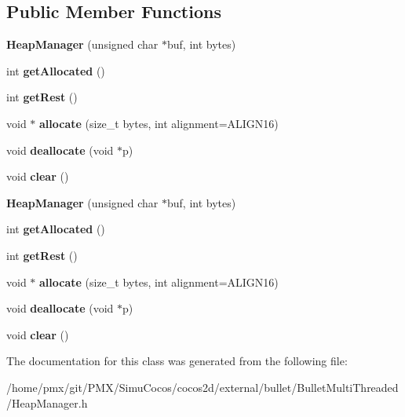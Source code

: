 \subsection*{Public Member Functions}
\begin{DoxyCompactItemize}
\item 
\mbox{\label{classHeapManager_a30a64630fa0e9d32080fcbdb9f243b75}} 
{\bfseries Heap\+Manager} (unsigned char $\ast$buf, int bytes)
\item 
\mbox{\label{classHeapManager_a6634102da3073f1b742a15171ace93d3}} 
int {\bfseries get\+Allocated} ()
\item 
\mbox{\label{classHeapManager_ab1c1762e6a5baedf2ad870b85a8b958e}} 
int {\bfseries get\+Rest} ()
\item 
\mbox{\label{classHeapManager_a20109bbc392db6d15b355a5ceb88166f}} 
void $\ast$ {\bfseries allocate} (size\+\_\+t bytes, int alignment=A\+L\+I\+G\+N16)
\item 
\mbox{\label{classHeapManager_a1ba5a00c9596ef5eedbaf984cb73cb6a}} 
void {\bfseries deallocate} (void $\ast$p)
\item 
\mbox{\label{classHeapManager_add0c480cf7618976a40bf6957cd2a70a}} 
void {\bfseries clear} ()
\item 
\mbox{\label{classHeapManager_a30a64630fa0e9d32080fcbdb9f243b75}} 
{\bfseries Heap\+Manager} (unsigned char $\ast$buf, int bytes)
\item 
\mbox{\label{classHeapManager_a6634102da3073f1b742a15171ace93d3}} 
int {\bfseries get\+Allocated} ()
\item 
\mbox{\label{classHeapManager_ab1c1762e6a5baedf2ad870b85a8b958e}} 
int {\bfseries get\+Rest} ()
\item 
\mbox{\label{classHeapManager_a20109bbc392db6d15b355a5ceb88166f}} 
void $\ast$ {\bfseries allocate} (size\+\_\+t bytes, int alignment=A\+L\+I\+G\+N16)
\item 
\mbox{\label{classHeapManager_a1ba5a00c9596ef5eedbaf984cb73cb6a}} 
void {\bfseries deallocate} (void $\ast$p)
\item 
\mbox{\label{classHeapManager_add0c480cf7618976a40bf6957cd2a70a}} 
void {\bfseries clear} ()
\end{DoxyCompactItemize}


The documentation for this class was generated from the following file\+:\begin{DoxyCompactItemize}
\item 
/home/pmx/git/\+P\+M\+X/\+Simu\+Cocos/cocos2d/external/bullet/\+Bullet\+Multi\+Threaded/Heap\+Manager.\+h\end{DoxyCompactItemize}
